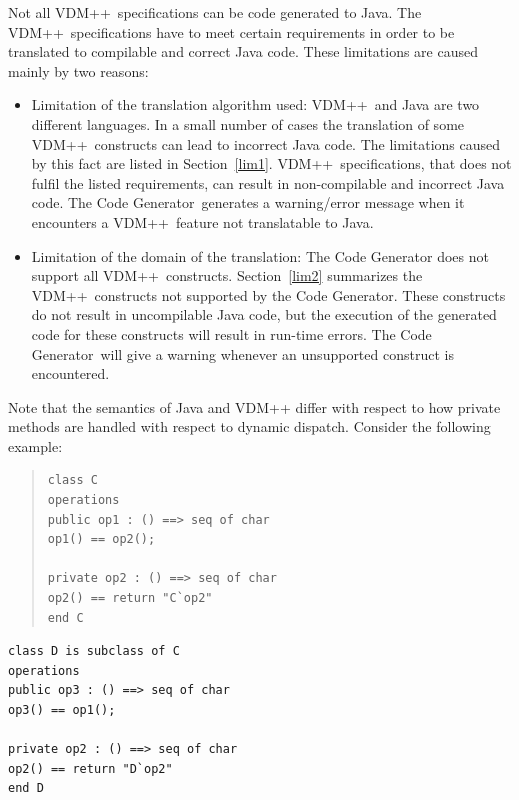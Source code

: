 \documentclass[\pformat,11pt]{article}
\newcommand{\tcg}{the Code Generator}
\newcommand{\Tcg}{The Code Generator}
\newcommand{\VDM}{VDM++}
\begin{document}
Not all \VDM\ specifications can be code generated to Java. The \VDM\
specifications have to meet certain requirements in order to be
translated to compilable and correct Java code. These limitations are
caused mainly by two reasons: 
\begin{itemize}
\item Limitation of the translation algorithm used: \VDM\ and Java are
  two different languages. In a small number of 
  cases the translation of some \VDM\ constructs can lead to incorrect
  Java code. The limitations caused by this fact are listed in
  Section~\ref{lim1}. \VDM\ specifications, that does not fulfil the
  listed requirements, can result in non-compilable and incorrect Java code.
  \Tcg\ generates a warning/error message when it encounters a \VDM\
  feature not translatable to Java. 
\item Limitation of the domain of the translation: The Code Generator
  does not support all \VDM\ 
  constructs. Section~\ref{lim2} summarizes the \VDM\ constructs not
  supported by \tcg{}. These 
  constructs do not result in uncompilable Java code, but the
  execution of the generated code for these constructs will result in
  run-time errors.  \Tcg\ will give a warning whenever an unsupported
  construct is encountered.
\end{itemize}
Note that the semantics of Java and VDM++ differ with respect to how
private methods are handled with respect to dynamic dispatch. Consider
the following example:

\begin{minipage}{.55\textwidth}
\begin{quote}
\begin{verbatim}
class C
operations
public op1 : () ==> seq of char
op1() == op2();

private op2 : () ==> seq of char
op2() == return "C`op2"
end C
\end{verbatim}
\end{quote}
\end{minipage}
\begin{minipage}{.45\textwidth}
\begin{verbatim}
class D is subclass of C
operations
public op3 : () ==> seq of char
op3() == op1();

private op2 : () ==> seq of char
op2() == return "D`op2"
end D
\end{verbatim}
\end{minipage}
\end{document}
